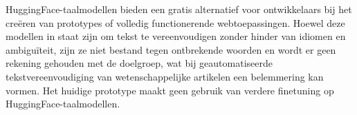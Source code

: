 
HuggingFace-taalmodellen bieden een gratis alternatief voor ontwikkelaars bij het creëren van prototypes of volledig functionerende webtoepassingen. Hoewel deze modellen in staat zijn om tekst te vereenvoudigen zonder hinder van idiomen en ambiguïteit, zijn ze niet bestand tegen ontbrekende woorden en wordt er geen rekening gehouden met de doelgroep, wat bij geautomatiseerde tekstvereenvoudiging van wetenschappelijke artikelen een belemmering kan vormen. Het huidige prototype maakt geen gebruik van verdere finetuning op HuggingFace-taalmodellen.

